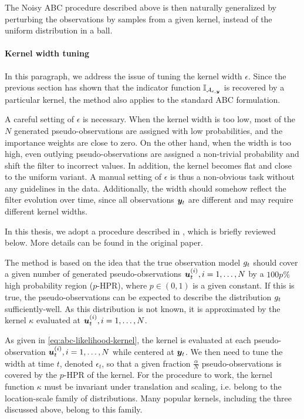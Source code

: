 The Noisy ABC procedure described above is then naturally generalized by perturbing the observations by samples from a given kernel, instead of the uniform distribution in a ball.


\paragraph{Kernel width tuning}
In this paragraph, we address the issue of tuning the kernel width $\epsilon$. Since the previous section has shown that the indicator function $\mathbb{I}_{\mathcal{A}_{\epsilon, \bm{y}}}$ is recovered by a particular kernel, the method also applies to the standard ABC formulation.

A careful setting of $\epsilon$ is necessary. When the kernel width is too low, most of the $N$ generated pseudo-observations are assigned with low probabilities, and the importance weights are close to zero. On the other hand, when the width is too high, even outlying pseudo-observations are assigned a non-trivial probability and shift the filter to incorrect values. In addition, the kernel becomes flat and close to the uniform variant. A manual setting of $\epsilon$ is thus a non-obvious task without any guidelines in the data. Additionally, the width should somehow reflect the filter evolution over time, since all observations $\bm{y}_t$ are different and may require different kernel widths.

In this thesis, we adopt a procedure described in \cite{dedecius}, which is briefly reviewed below. More details can be found in the original paper.

The method is based on the idea that the true observation model $g_t$ should cover a given number of generated pseudo-observations $\bm{u}_t^{(i)}, i = 1, \ldots, N$ by a $100p\%$ high probability region ($p$-HPR), where $p \in \left(0, 1\right)$ is a given constant. If this is true, the pseudo-observations can be expected to describe the distribution $g_t$ sufficiently-well. As this distribution is not known, it is approximated by the kernel $\kappa$ evaluated at $\bm{u}_t^{(i)}, i = 1, \ldots, N$.

As given in \eqref{eq:abc-likelihood-kernel}, the kernel is evaluated at each pseudo-observation $\bm{u}_t^{(i)}, i = 1, \ldots, N$ while centered at $\bm{y}_t$. We then need to tune the width at time $t$, denoted $\epsilon_t$, so that a given fraction $\displaystyle \frac{\alpha}{N}$ pseudo-observations is covered by the $p$-HPR of the kernel. For the procedure to work, the kernel function $\kappa$ must be invariant under translation and scaling, i.e. belong to the location-scale family of distributions. Many popular kernels, including the three discussed above, belong to this family.

